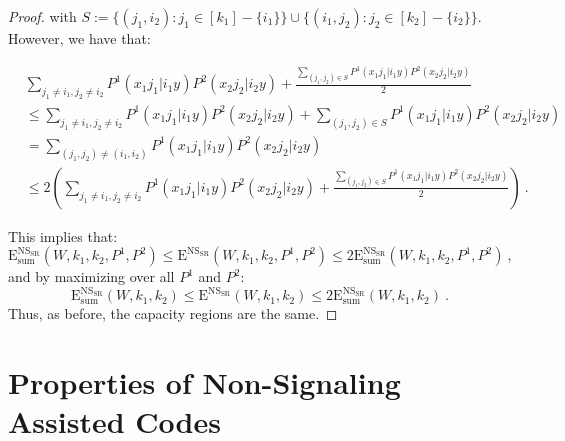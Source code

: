 \documentclass[11pt]{article}
\theoremstyle{definition}
\theoremstyle{remark}
\begin{document}
\begin{proof}
with $S := \{(j_1,i_2) : j_1 \in [k_1]-\{i_1\}\} \cup \{(i_1,j_2) : j_2 \in [k_2]-\{i_2\}\}$. However, we have that:

\begin{equation}
  \begin{aligned}
    &\sum_{j_1\not=i_1,j_2\not=i_2}P^1(x_1j_1|i_1y)P^2(x_2j_2|i_2y) + \frac{\sum_{(j_1,j_2) \in S}P^1(x_1j_1|i_1y)P^2(x_2j_2|i_2y)}{2}\\
    &\leq \sum_{j_1\not=i_1,j_2\not=i_2}P^1(x_1j_1|i_1y)P^2(x_2j_2|i_2y) + \sum_{(j_1,j_2) \in S}P^1(x_1j_1|i_1y)P^2(x_2j_2|i_2y)\\
    &= \sum_{(j_1,j_2) \not= (i_1,i_2)}P^1(x_1j_1|i_1y)P^2(x_2j_2|i_2y)\\
    &\leq 2\left(\sum_{j_1\not=i_1,j_2\not=i_2}P^1(x_1j_1|i_1y)P^2(x_2j_2|i_2y) + \frac{\sum_{(j_1,j_2) \in S}P^1(x_1j_1|i_1y)P^2(x_2j_2|i_2y)}{2}\right) \ .
  \end{aligned}
\end{equation}

This implies that:
\[\mathrm{E}_{\text{sum}}^{\mathrm{NS}_{\mathrm{SR}}}(W,k_1,k_2,P^1,P^2) \leq \mathrm{E}^{\mathrm{NS}_{\mathrm{SR}}}(W,k_1,k_2,P^1,P^2) \leq 2\mathrm{E}_{\text{sum}}^{\mathrm{NS}_{\mathrm{SR}}}(W,k_1,k_2,P^1,P^2) \ ,\]
and by maximizing over all $P^1$ and $P^2$:
\[\mathrm{E}_{\text{sum}}^{\mathrm{NS}_{\mathrm{SR}}}(W,k_1,k_2) \leq \mathrm{E}^{\mathrm{NS}_{\mathrm{SR}}}(W,k_1,k_2) \leq 2\mathrm{E}_{\text{sum}}^{\mathrm{NS}_{\mathrm{SR}}}(W,k_1,k_2) \ .\]
Thus, as before, the capacity regions are the same.
\end{proof}

\section{Properties of Non-Signaling Assisted Codes}
\label{section:complexity}
\end{document}
